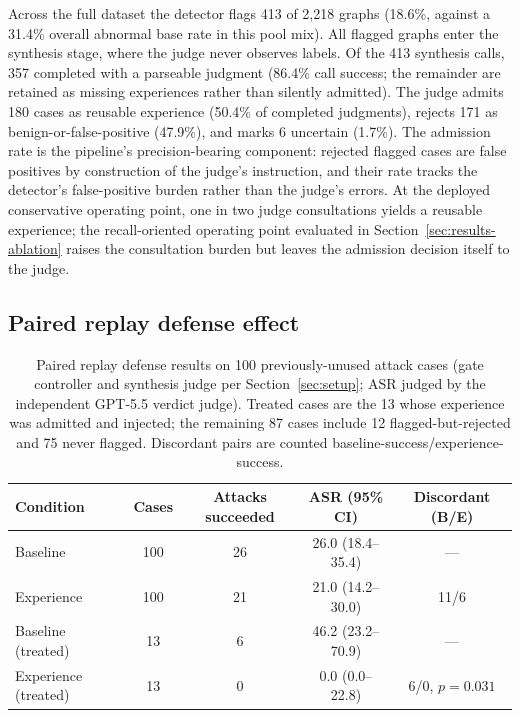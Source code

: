 Across the full dataset the detector flags 413 of 2{,}218 graphs (18.6\%, against a 31.4\% overall abnormal base rate in this pool mix). All flagged graphs enter the synthesis stage, where the judge never observes labels. Of the 413 synthesis calls, 357 completed with a parseable judgment (86.4\% call success; the remainder are retained as missing experiences rather than silently admitted). The judge admits 180 cases as reusable experience (50.4\% of completed judgments), rejects 171 as benign-or-false-positive (47.9\%), and marks 6 uncertain (1.7\%). The admission rate is the pipeline's precision-bearing component: rejected flagged cases are false positives by construction of the judge's instruction, and their rate tracks the detector's false-positive burden rather than the judge's errors. At the deployed conservative operating point, one in two judge consultations yields a reusable experience; the recall-oriented operating point evaluated in Section~\ref{sec:results-ablation} raises the consultation burden but leaves the admission decision itself to the judge.

\subsection{Paired replay defense effect}
\label{sec:results-replay}

\begin{table}[t]
\centering
\caption{Paired replay defense results on 100 previously-unused \tool{} attack cases (gate controller and synthesis judge per Section~\ref{sec:setup}; ASR judged by the independent GPT-5.5 verdict judge). Treated cases are the 13 whose experience was admitted and injected; the remaining 87 cases include 12 flagged-but-rejected and 75 never flagged. Discordant pairs are counted baseline-success/experience-success.}
\label{tab:asr}
\begin{tabular}{lcccc}
\toprule
Condition & Cases & Attacks succeeded & ASR (95\% CI) & Discordant (B/E) \\
\midrule
Baseline & 100 & 26 & 26.0 (18.4--35.4) & --- \\
Experience & 100 & 21 & 21.0 (14.2--30.0) & 11/6 \\
\midrule
Baseline (treated) & 13 & 6 & 46.2 (23.2--70.9) & --- \\
Experience (treated) & 13 & 0 & 0.0 (0.0--22.8) & 6/0, $p=0.031$ \\
\bottomrule
\end{tabular}
\end{table}

